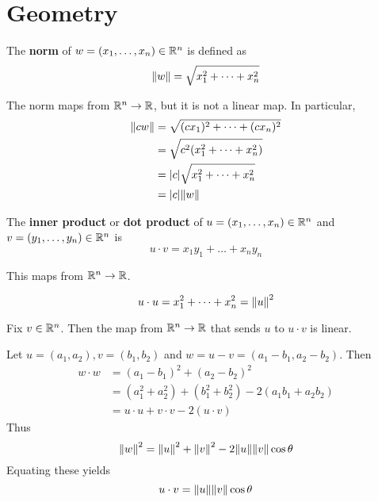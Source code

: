 \documentclass{article}
\begin{document}
\section{Geometry}
\begin{definition}
  The \textbf{norm} of $w = (x_1, \ldots, x_n) \in \mathbb{R}^n$ is defined as \[
    \norm{w} = \sqrt{x_1^2 + \dots + x_n^2}
  \]
\end{definition}
\begin{corollary}
  The norm maps from $\mathbb{R}^n \to \mathbb{R}$, but it is not a linear map. In particular,
  \begin{align*}
    \norm{cw} & = \sqrt{(cx_1)^2 + \dots + (cx_n)^2} \\
              & = \sqrt{c^2(x_1^2 + \dots + x_n^2)}  \\
              & = \abs{c}\sqrt{x_1^2 + \dots +x_n^2} \\
              & = \abs{c}\norm{w}                    \\
  \end{align*}
\end{corollary}
\begin{definition}
  The \textbf{inner product} or \textbf{dot product} of $u = (x_1, \ldots, x_n) \in \mathbb{R}^n$ and $v = (y_1, \ldots, y_n) \in \mathbb{R}^n$ is \[
    u \cdot v = x_1y_1 + \dots +x_ny_n
  \]

  This maps from $\mathbb{R}^n \to \mathbb{R}$.
\end{definition}
\begin{corollary}
  \[
    u \cdot u = x_1^2 + \dots +x_n^2 = \norm{u}^2
  \]
\end{corollary}
\begin{theorem}
  Fix $v \in \mathbb{R}^n$. Then the map from $\mathbb{R}^n \to \mathbb{R}$ that sends $u$ to $u \cdot v$ is linear.
\end{theorem}
\begin{remark}
  Let $u = (a_1, a_2), v = (b_1, b_2)$ and $w = u - v = (a_1 - b_1, a_2-b_2)$.
  Then
  \begin{align*}
    w \cdot w & = (a_1 - b_1)^2 + (a_2 - b_2)^2                          \\
              & = (a_1^2 + a_2^2) + (b_1^2 + b_2^2) - 2(a_1b_1 + a_2b_2) \\
              & = u \cdot u + v\cdot v - 2(u\cdot v)
  \end{align*}
  Thus \[
    \norm{w}^2 = \norm{u}^2 + \norm{v}^2 - 2\norm{u}\norm{v} \cos \theta
  \]
  Equating these yields \[
    u\cdot v = \norm{u}\norm{v}\cos\theta
  \]
\end{remark}
\end{document}
